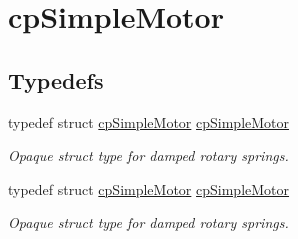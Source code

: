 \hypertarget{group__cpSimpleMotor}{}\section{cp\+Simple\+Motor}
\label{group__cpSimpleMotor}
\subsection*{Typedefs}
\begin{DoxyCompactItemize}
\item 
\mbox{\label{group__cpSimpleMotor_ga0b1689742ce8e31d9a4b3bcae83db2e7}} 
typedef struct \hyperlink{structcpSimpleMotor}{cp\+Simple\+Motor} \hyperlink{group__cpSimpleMotor_ga0b1689742ce8e31d9a4b3bcae83db2e7}{cp\+Simple\+Motor}
\begin{DoxyCompactList}\small\item\em Opaque struct type for damped rotary springs. \end{DoxyCompactList}\item 
\mbox{\label{group__cpSimpleMotor_ga0b1689742ce8e31d9a4b3bcae83db2e7}} 
typedef struct \hyperlink{structcpSimpleMotor}{cp\+Simple\+Motor} \hyperlink{group__cpSimpleMotor_ga0b1689742ce8e31d9a4b3bcae83db2e7}{cp\+Simple\+Motor}
\begin{DoxyCompactList}\small\item\em Opaque struct type for damped rotary springs. \end{DoxyCompactList}\end{DoxyCompactItemize}
